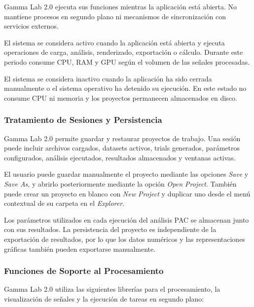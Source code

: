 \documentclass[12pt, letterpaper]{article}
\begin{document}
Gamma Lab 2.0 ejecuta sus funciones mientras la aplicación está abierta. No
mantiene procesos en segundo plano ni mecanismos de sincronización con
servicios externos.

El sistema se considera activo cuando la aplicación está abierta y ejecuta
operaciones de carga, análisis, renderizado, exportación o cálculo. Durante
este periodo consume CPU, RAM y GPU según el volumen de las señales
procesadas.

El sistema se considera inactivo cuando la aplicación ha sido cerrada
manualmente o el sistema operativo ha detenido su ejecución. En este estado
no consume CPU ni memoria y los proyectos permanecen almacenados en disco.

\subsubsection{Tratamiento de Sesiones y Persistencia}

Gamma Lab 2.0 permite guardar y restaurar proyectos de trabajo. Una sesión
puede incluir archivos cargados, datasets activos, trials generados,
parámetros configurados, análisis ejecutados, resultados almacenados y
ventanas activas.

El usuario puede guardar manualmente el proyecto mediante las opciones
\textit{Save} y \textit{Save As}, y abrirlo posteriormente mediante la
opción \textit{Open Project}. También puede crear un proyecto en blanco con
\textit{New Project} y duplicar uno desde el menú contextual de su carpeta en
el \textit{Explorer}.

Los parámetros utilizados en cada ejecución del análisis PAC se almacenan
junto con sus resultados. La persistencia del proyecto es independiente de
la exportación de resultados, por lo que los datos numéricos y las
representaciones gráficas también pueden exportarse manualmente.

\subsubsection{Funciones de Soporte al Procesamiento}

Gamma Lab 2.0 utiliza las siguientes librerías para el procesamiento, la
visualización de señales y la ejecución de tareas en segundo plano:
\end{document}
